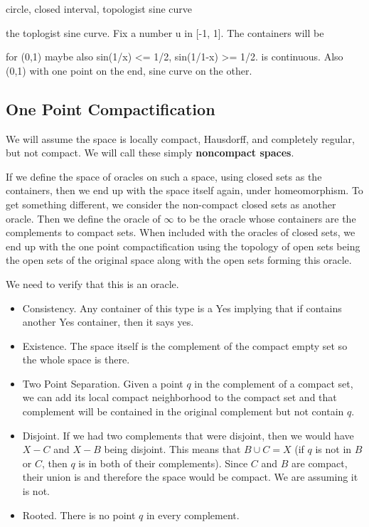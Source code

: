 \documentclass[12pt]{article}
\begin{document}
circle, closed interval, topologist sine curve

the toplogist sine curve. Fix a number u in [-1, 1]. The containers will be 

for (0,1) maybe also sin(1/x) <= 1/2,  sin(1/1-x) >= 1/2. is continuous. Also (0,1) with one point on the end, sine curve on the other. 


\subsection{One Point Compactification}

We will assume the space is locally compact, Hausdorff, and completely regular, but not compact. We will call these simply \textbf{noncompact spaces}. 

If we define the space of oracles on such a space, using closed sets as the containers, then we end up with the space itself again, under homeomorphism. To get something different, we consider the non-compact closed sets as another oracle. Then we define the oracle of $\infty$ to be the oracle whose containers are the complements to  compact sets. When included with the oracles of closed sets, we end up with the one point compactification using the topology of open sets being the open sets of the original space along with the open sets forming this oracle. 

We need to verify that this is an oracle.  
\begin{itemize}
    \item Consistency. Any container of this type is a Yes implying that if contains another Yes container, then it says yes. 
    \item Existence. The space itself is the complement of the compact empty set so the whole space is there. 
    \item Two Point Separation. Given a point $q$ in the complement of a compact set, we can add its local compact neighborhood to the compact set and that complement will be contained in the original complement but not contain $q$. 
    \item Disjoint. If we had two complements that were disjoint, then we would have $X-C$ and $X-B$ being disjoint. This means that $B \cup C = X$ (if $q$ is not in $B$ or $C$, then $q$ is in both of their complements). Since $C$ and $B$ are compact, their union is and therefore the space would be compact. We are assuming it is not.
    \item Rooted. There is no point $q$ in every complement. 
\end{itemize}
\end{document}
